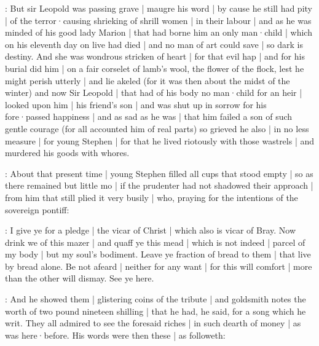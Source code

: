 :
But sir Leopold was passing grave |
maugre his word |
by cause he still had pity |
of the terror·causing shrieking of shrill women |
in their labour |
and as he was minded of his good lady Marion |
that had borne him an only man·child |
which on his eleventh day on live had died |
and no man of art could save |
so dark is destiny.
And she was wondrous stricken of heart |
for that evil hap |
and for his burial did him |
on a fair corselet of lamb's wool,
the flower of the flock,
lest he might perish utterly |
and lie akeled
(for it was then about the midst of the winter)
and now Sir Leopold |
that had of his body no man·child for an heir |
looked upon him |
his friend's son |
and was shut up in sorrow for his fore·passed happiness |
and as sad as he was |
that him failed a son of such gentle courage
(for all accounted him of real parts)
so grieved he also |
in no less measure |
for young Stephen |
for that he lived riotously with those wastrels |
and murdered his goods with whores.



:
About that present time |
young Stephen filled all cups that stood empty |
so as there remained but little mo |
if the prudenter had not shadowed their approach |
from him that still plied it very busily |
who, praying for the intentions
of the sovereign pontiff:

\stephen:
I give ye for a pledge |
the vicar of Christ |
which also is vicar of Bray.
Now drink we of this mazer |
and quaff ye this mead |
which is not indeed |
parcel of my body |
but my soul's bodiment.
Leave ye fraction of bread to them |
that live by bread alone.
Be not afeard |
neither for any want |
for this will comfort |
more than the other will dismay.
See ye here.

:
And he showed them |
glistering coins of the tribute |
and goldsmith notes the worth of two pound nineteen shilling |
that he had,
he said,
for a song which he writ.
They all admired to see the foresaid riches |
in such dearth of money |
as was here·before.
His words were then these |
as followeth:

